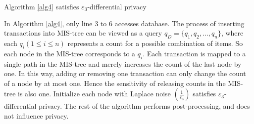 \documentclass[conference]{IEEEtran}
\begin{document}
\begin{theorem}
Algorithm \ref{alg4} satisfies $\varepsilon_3$-differential privacy
\end{theorem}
\begin{IEEEproof}
In Algorithm \ref{alg4}, only line 3 to 6 accesses database. 
The process of inserting transactions into MIS-tree can be viewed as a query $q_D = \{q_1,q_2,\dots,q_n\}$, 
where each $q_i(1\leq i\leq n)$ represents a count for a possible combination of items.
So each node in the MIS-tree corresponds to a $q_i$. 
Each transaction is mapped to a single path in the MIS-tree and merely increases the count of the last node by one. 
In this way, adding or removing one transaction can only change the count of a node by at most one.
Hence the sensitivity of releasing counts in the MIS-tree is also one. 
Initialize each node with Laplace noise $(\frac{1}{\varepsilon_3})$ satisfies $\varepsilon_3$-differential privacy.
The rest of the algorithm performs post-processing, and does not influence privacy.
\end{IEEEproof}
\end{document}
